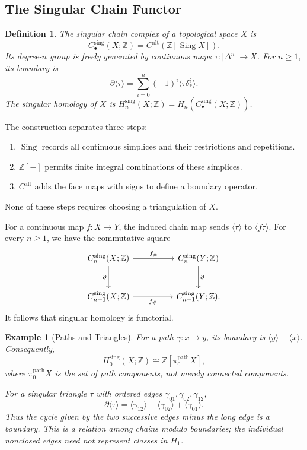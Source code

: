 \documentclass[11pt]{article}
\theoremstyle{linked}
\theoremstyle{plainlecture}
\newtheorem{definition}[proposition]{Definition}
\newtheorem{example}[proposition]{Example}
\newcommand{\Z}{\mathbb Z}
\newcommand{\Sing}{\operatorname{Sing}}
\newcommand{\C}{C^{\mathrm{alt}}}
\begin{document}
\subsection{The Singular Chain Functor}
\begin{definition}
The singular chain complex of a topological space $X$ is
\[
C_\bullet^{\mathrm{sing}}(X;\Z)
=\C(\Z[\Sing X]).
\]
Its degree-$n$ group is freely generated by continuous maps $\tau:\lvert\Delta^{n}\rvert\to X$. For $n\geq1$, its boundary is
\[
\partial\langle\tau\rangle
=\sum_{i=0}^n(-1)^i\langle\tau\delta^i_*\rangle.
\]
The singular homology of $X$ is $H_n^{\mathrm{sing}}(X;\Z)=H_n(C_\bullet^{\mathrm{sing}}(X;\Z))$.
\end{definition}
The construction separates three steps:
\begin{enumerate}
\item $\Sing$ records all continuous simplices and their restrictions and repetitions.
\item $\Z[-]$ permits finite integral combinations of these simplices.
\item $\C$ adds the face maps with signs to define a boundary operator.
\end{enumerate}
None of these steps requires choosing a triangulation of $X$.

For a continuous map $f:X\to Y$, the induced chain map sends $\langle\tau\rangle$ to $\langle f\tau\rangle$. For every $n\geq1$, we have the commutative square
\[
\begin{tikzcd}[column sep=huge,row sep=large]
C_n^{\mathrm{sing}}(X;\Z) \arrow[r,"f_\#"] \arrow[d,"\partial"'] &
C_n^{\mathrm{sing}}(Y;\Z) \arrow[d,"\partial"]\\
C_{n-1}^{\mathrm{sing}}(X;\Z) \arrow[r,"f_\#"'] &
C_{n-1}^{\mathrm{sing}}(Y;\Z).
\end{tikzcd}
\]
It follows that singular homology is functorial.

\begin{example}[Paths and Triangles]
For a path $\gamma:x\to y$, its boundary is $\langle y\rangle-\langle x\rangle$. Consequently,
\[
H_0^{\mathrm{sing}}(X;\Z)\cong\Z[\pi_0^{\mathrm{path}}X],
\]
where $\pi_0^{\mathrm{path}}X$ is the set of path components, not merely connected components.

For a singular triangle $\tau$ with ordered edges $\gamma_{01},\gamma_{02},\gamma_{12}$,
\[
\partial\langle\tau\rangle
=\langle\gamma_{12}\rangle-\langle\gamma_{02}\rangle+\langle\gamma_{01}\rangle.
\]
Thus the cycle given by the two successive edges minus the long edge is a boundary. This is a relation among chains modulo boundaries; the individual nonclosed edges need not represent classes in $H_1$.
\end{example}
\end{document}
